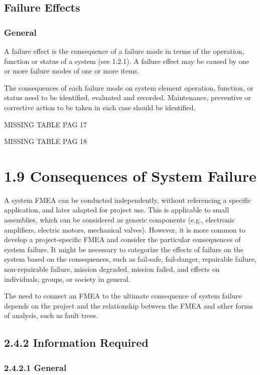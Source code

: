 \documentclass[./dissertation.tex]{subfiles}
\begin{document}
\subsection{Failure Effects}
\subsubsection{General}
A failure effect is the consequence of a failure mode in terms of the operation, function or status of a system (see 1.2.1). A failure effect may be caused by one or more failure modes of one or more items.

The consequences of each failure mode on system element operation, function, or status need to be identified, evaluated and recorded. Maintenance, preventive or corrective action to be taken in each case should be identified.

MISSING TABLE PAG 17

MISSING TABLE PAG 18

\section{1.9 Consequences of System Failure}

A system FMEA can be conducted independently, without referencing a specific application, and later adapted for project use. This is applicable to small assemblies, which can be considered as generic components (e.g., electronic amplifiers, electric motors, mechanical valves). However, it is more common to develop a project-specific FMEA and consider the particular consequences of system failure. It might be necessary to categorize the effects of failure on the system based on the consequences, such as fail-safe, fail-danger, repairable failure, non-repairable failure, mission degraded, mission failed, and effects on individuals, groups, or society in general.

The need to connect an FMEA to the ultimate consequence of system failure depends on the project and the relationship between the FMEA and other forms of analysis, such as fault trees.

\subsection{2.4.2 Information Required}

\subsubsection{2.4.2.1 General}
\end{document}
